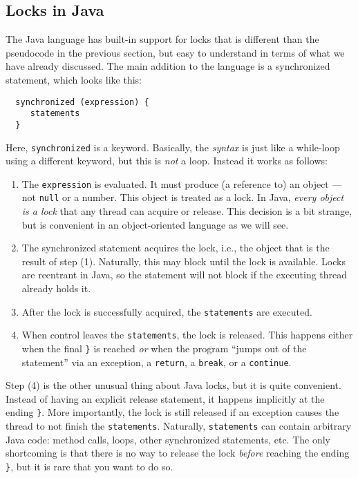 \documentclass[10pt]{article}
\begin{document}
\subsection{Locks in Java}
\label{sec:java-locks}

The Java language has built-in support for locks that is different
than the pseudocode in the previous section, but easy to understand in
terms of what we have already discussed.  The main addition to the
language is a synchronized statement, which looks like this:
\begin{verbatim}
  synchronized (expression) {
     statements
  }
\end{verbatim}
Here, {\tt synchronized} is a keyword.  Basically, the \emph{syntax}
is just like a while-loop using a different keyword, but this is
\emph{not} a loop.  Instead it works as follows:
\begin{enumerate}
\item The {\tt expression} is evaluated.  It must produce (a reference
  to) an object --- not {\tt null} or a number.  This object is
  treated as a lock.  In Java, \emph{every object is a lock} that any
  thread can acquire or release.  This decision is a bit strange, but
  is convenient in an object-oriented language as we will see.
\item The synchronized statement acquires the lock, i.e., the object
  that is the result of step (1).  Naturally, this may block until the
  lock is available.  Locks are reentrant in Java, so the statement
  will not block if the executing thread already holds it.
\item After the lock is successfully acquired, the {\tt statements}
  are executed.
\item When control leaves the {\tt statements}, the lock is released.
  This happens either when the final {\tt \}} is reached \emph{or}
  when the program ``jumps out of the statement'' via an exception, a
  {\tt return}, a {\tt break}, or a {\tt continue}.
\end{enumerate}
Step (4) is the other unusual thing about Java locks, but it is quite
convenient.  Instead of having an explicit release statement, it
happens implicitly at the ending {\tt \}}.  More importantly, the
lock is still released if an exception causes the thread to not 
finish the {\tt statements}.  Naturally, {\tt statements} can contain
arbitrary Java code: method calls, loops, other synchronized
statements, etc.  The only shortcoming is that there is no way to
release the lock \emph{before} reaching the ending {\tt \}}, but it
is rare that you want to do so.
\end{document}
